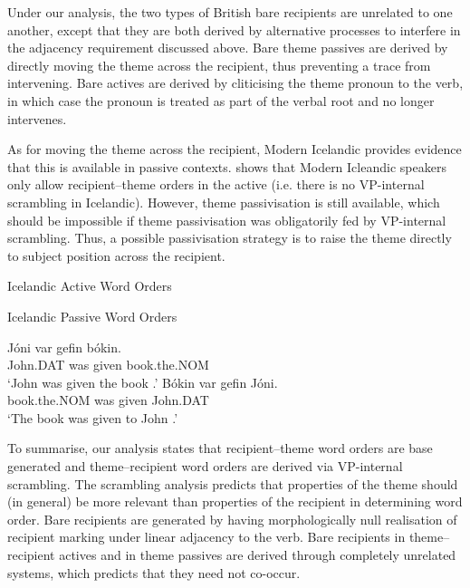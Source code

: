 Under our analysis, the two types of British bare recipients are unrelated to one another, except that they are both derived by alternative processes to interfere in the adjacency requirement discussed above. Bare theme passives are derived by directly moving the theme across the recipient, thus preventing a trace from intervening. Bare actives are derived by cliticising the theme pronoun to the verb, in which case the pronoun is treated as part of the verbal root and no longer intervenes.

As for moving the theme across the recipient, Modern Icelandic provides evidence that this is available in passive contexts. \cite{Dehe.2004} shows that Modern Icleandic speakers only allow recipient--theme orders in the active (i.e. there is no VP-internal scrambling in Icelandic). However, theme passivisation is still available, which should be impossible if theme passivisation was obligatorily fed by VP-internal scrambling. Thus, a possible passivisation strategy is to raise the theme directly to subject position across the recipient.

\begin{exe}
\ex Icelandic Active Word Orders
\begin{xlist}
\end{xlist}
\ex Icelandic Passive Word Orders
\begin{xlist}
\ex \gll J\'{o}ni var gefin b\'{o}kin.\\
John.DAT was given book.the.NOM\\
\trans `John was given the book \citep{Holmberg.1995,Bardal.2001}.'
\ex \gll B\'{o}kin var gefin J\'{o}ni.\\
book.the.NOM was given John.DAT\\
\trans `The book was given to John \citep{Holmberg.1995,Bardal.2001}.'
\end{xlist}
\end{exe}

To summarise, our analysis states that recipient--theme word orders are base generated and theme--recipient word orders are derived via VP-internal scrambling. The scrambling analysis predicts that properties of the theme should (in general) be more relevant than properties of the recipient in determining word order. Bare recipients are generated by having morphologically null realisation of recipient marking under linear adjacency to the verb. Bare recipients in theme--recipient actives and in theme passives are derived through completely unrelated systems, which predicts that they need not co-occur.

